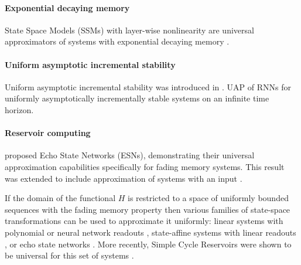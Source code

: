 \documentclass{article}
\theoremstyle{definition}
\theoremstyle{remark}
\newcounter{ct}
\begin{document}
\paragraph{Exponential decaying memory}
State Space Models (SSMs) with layer-wise nonlinearity are universal approximators of systems with exponential decaying memory \citep{wang2024state}.


\paragraph{Uniform asymptotic incremental stability}
Uniform asymptotic incremental stability was introduced in \citep{pavlov2006uniform}.
UAP of RNNs for uniformly asymptotically incrementally stable systems on an infinite time horizon\citep{hanson2020universal, hanson2021learning}.



\paragraph{Reservoir computing}


\citet{jaeger2001echo} proposed Echo State Networks (ESNs), demonstrating their universal approximation capabilities specifically for fading memory systems.
This result was extended to include approximation of systems with an input \citep{manjunath2013echo}.

If the domain of the functional $H$ is restricted to a space of uniformly bounded sequences with the fading memory property then various families of state-space transformations can be used to approximate it uniformly: 
 linear systems with polynomial or neural network readouts \citep{boyd1985fading,grigoryeva2018universal,gonon2019reservoir}, state-affine systems with linear readouts \citep{grigoryeva2018universal}, or echo state networks \citep{grigoryeva2018echo,gonon2019reservoir,gonon2021fading,gonon2023approximation}.
 More recently, Simple Cycle Reservoirs were shown to be universal for this set of systems \citep{li2023simple}.
\end{document}
